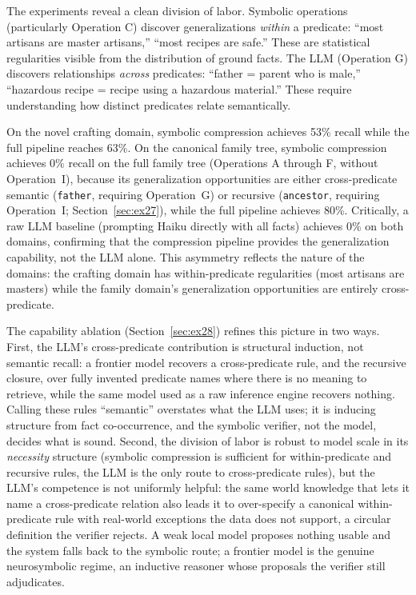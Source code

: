 \documentclass[10pt,conference]{IEEEtran}
\begin{document}
The experiments reveal a clean division of labor. Symbolic operations (particularly Operation C) discover generalizations \emph{within} a predicate: ``most artisans are master artisans,'' ``most recipes are safe.'' These are statistical regularities visible from the distribution of ground facts. The LLM (Operation G) discovers relationships \emph{across} predicates: ``father = parent who is male,'' ``hazardous recipe = recipe using a hazardous material.'' These require understanding how distinct predicates relate semantically.

On the novel crafting domain, symbolic compression achieves 53\% recall while the full pipeline reaches 63\%. On the canonical family tree, symbolic compression achieves 0\% recall on the full family tree (Operations A through F, without Operation~I), because its generalization opportunities are either cross-predicate semantic (\texttt{father}, requiring Operation~G) or recursive (\texttt{ancestor}, requiring Operation~I; Section~\ref{sec:ex27}), while the full pipeline achieves 80\%. Critically, a raw LLM baseline (prompting Haiku directly with all facts) achieves 0\% on both domains, confirming that the compression pipeline provides the generalization capability, not the LLM alone. This asymmetry reflects the nature of the domains: the crafting domain has within-predicate regularities (most artisans are masters) while the family domain's generalization opportunities are entirely cross-predicate.

The capability ablation (Section~\ref{sec:ex28}) refines this picture in two ways. First, the LLM's cross-predicate contribution is structural induction, not semantic recall: a frontier model recovers a cross-predicate rule, and the recursive closure, over fully invented predicate names where there is no meaning to retrieve, while the same model used as a raw inference engine recovers nothing. Calling these rules ``semantic'' overstates what the LLM uses; it is inducing structure from fact co-occurrence, and the symbolic verifier, not the model, decides what is sound. Second, the division of labor is robust to model scale in its \emph{necessity} structure (symbolic compression is sufficient for within-predicate and recursive rules, the LLM is the only route to cross-predicate rules), but the LLM's competence is not uniformly helpful: the same world knowledge that lets it name a cross-predicate relation also leads it to over-specify a canonical within-predicate rule with real-world exceptions the data does not support, a circular definition the verifier rejects. A weak local model proposes nothing usable and the system falls back to the symbolic route; a frontier model is the genuine neurosymbolic regime, an inductive reasoner whose proposals the verifier still adjudicates.
\end{document}
